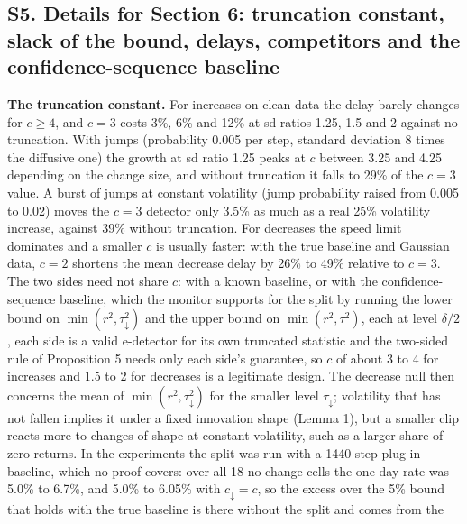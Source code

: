 \documentclass[
]{article}
\begin{document}
\hypertarget{s5.-details-for-section-6-truncation-constant-slack-of-the-bound-delays-competitors-and-the-confidence-sequence-baseline}{%
\subsection{S5. Details for Section 6: truncation constant, slack of the
bound, delays, competitors and the confidence-sequence
baseline}\label{s5.-details-for-section-6-truncation-constant-slack-of-the-bound-delays-competitors-and-the-confidence-sequence-baseline}}

\textbf{The truncation constant.} For increases on clean data the delay
barely changes for \(c \ge 4\), and \(c = 3\) costs 3\%, 6\% and 12\% at
sd ratios 1.25, 1.5 and 2 against no truncation. With jumps (probability
0.005 per step, standard deviation 8 times the diffusive one) the growth
at sd ratio 1.25 peaks at \(c\) between 3.25 and 4.25 depending on the
change size, and without truncation it falls to 29\% of the \(c = 3\)
value. A burst of jumps at constant volatility (jump probability raised
from 0.005 to 0.02) moves the \(c = 3\) detector only 3.5\% as much as a
real 25\% volatility increase, against 39\% without truncation. For
decreases the speed limit dominates and a smaller \(c\) is usually
faster: with the true baseline and Gaussian data, \(c = 2\) shortens the
mean decrease delay by 26\% to 49\% relative to \(c = 3\). The two sides
need not share \(c\): with a known baseline, or with the
confidence-sequence baseline, which the monitor supports for the split
by running the lower bound on \(\min(r^2, \tau_{\downarrow}^2)\) and the
upper bound on \(\min(r^2, \tau^2)\), each at level \(\delta/2\), each
side is a valid e-detector for its own truncated statistic and the
two-sided rule of Proposition 5 needs only each side's guarantee, so
\(c\) of about 3 to 4 for increases and 1.5 to 2 for decreases is a
legitimate design. The decrease null then concerns the mean of
\(\min(r^2, \tau_{\downarrow}^2)\) for the smaller level
\(\tau_{\downarrow}\); volatility that has not fallen implies it under a
fixed innovation shape (Lemma 1), but a smaller clip reacts more to
changes of shape at constant volatility, such as a larger share of zero
returns. In the experiments the split was run with a 1440-step plug-in
baseline, which no proof covers: over all 18 no-change cells the one-day
rate was 5.0\% to 6.7\%, and 5.0\% to 6.05\% with
\(c_{\downarrow} = c\), so the excess over the 5\% bound that holds with
the true baseline is there without the split and comes from the
\end{document}
